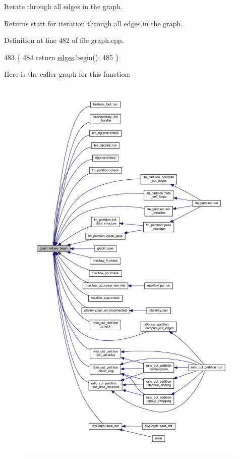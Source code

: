 Iterate through all edges in the graph.

\begin{DoxyReturn}{Returns}
start for iteration through all edges in the graph. 
\end{DoxyReturn}


Definition at line 482 of file graph.\+cpp.


\begin{DoxyCode}
483 \{
484     \textcolor{keywordflow}{return} \mbox{\hyperlink{classgraph_ab5b1c610cca1bcf72b05aacc28a48153}{edges}}.begin();
485 \}
\end{DoxyCode}
Here is the caller graph for this function\+:\nopagebreak
\begin{figure}[H]
\begin{center}
\leavevmode
\includegraphics[height=550pt]{classgraph_a7ba35a4c4e8343ffb27ed6d9703c6f18_icgraph}
\end{center}
\end{figure}
\mbox{\label{classgraph_aea8d7f976b85b6137f52d915e26639f6}} 
